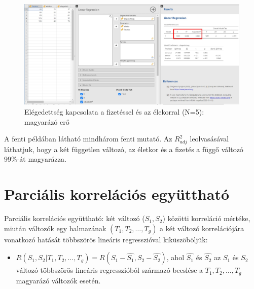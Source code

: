 \documentclass[
  letterpaper,
]{krantz}
\makeatletter
\newenvironment{Shaded}{\begin{snugshade}}{\end{snugshade}}
\newcommand{\CommentTok}[1]{\textcolor[rgb]{0.37,0.37,0.37}{#1}}
\newcommand{\FunctionTok}[1]{\textcolor[rgb]{0.28,0.35,0.67}{#1}}
\newcommand{\NormalTok}[1]{\textcolor[rgb]{0.00,0.23,0.31}{#1}}
\newcommand{\SpecialCharTok}[1]{\textcolor[rgb]{0.37,0.37,0.37}{#1}}
\providecommand{\tightlist}{%
  \setlength{\itemsep}{0pt}\setlength{\parskip}{0pt}}\usepackage{longtable,booktabs,array}
\newenvironment{kframe}{%
\medskip{}
\setlength{\fboxsep}{.8em}
 \def\at@end@of@kframe{}%
 \ifinner\ifhmode%
  \def\at@end@of@kframe{\end{minipage}}%
  \begin{minipage}{\columnwidth}%
 \fi\fi%
 \def\FrameCommand##1{\hskip\@totalleftmargin \hskip-\fboxsep
 \colorbox{shadecolor}{##1}\hskip-\fboxsep
     \hskip-\linewidth \hskip-\@totalleftmargin \hskip\columnwidth}%
 \MakeFramed {\advance\hsize-\width
   \@totalleftmargin\z@ \linewidth\hsize
   \@setminipage}}%
 {\par\unskip\endMakeFramed%
 \at@end@of@kframe}
\renewenvironment{Shaded}{\begin{kframe}}{\end{kframe}}
\makeatother
\begin{document}
\begin{Shaded}
\end{Shaded}

\begin{figure}

{\centering \includegraphics{./images/lin_reg_fizetes_eletkor_elegedettseg_01_kep_04.jpg}

}

\caption{Elégedettség kapcsolata a fizetéssel és az élekorral (N=5):
magyarázó erő}

\end{figure}

A fenti példában látható mindhárom fenti mutató. Az \(R_{adj}^2\)
leolvasásával láthatjuk, hogy a két független változó, az életkor és a
fizetés a függő változó 99\%-át magyarázza.

\hypertarget{parciuxe1lis-korreluxe1ciuxf3s-egyuxfctthatuxf3}{%
\section{Parciális korrelációs
együttható}\label{parciuxe1lis-korreluxe1ciuxf3s-egyuxfctthatuxf3}}

Parciális korrelációs együttható: két változó (\(S_1,S_2\)) közötti
korreláció mértéke, miután változók egy halmazának
\((T_1,T_2,\dots,T_g)\) a két változó korrelációjára vonatkozó hatását
többszörös lineáris regresszióval kiküszöböljük:

\begin{itemize}
\tightlist
\item
  \(R( S_1,S_2 |T_1,T_2,\dots,T_g )= R(S_1- \hat{S_1},S_2- \hat{S_2})\),
  ahol \(\hat{S_1}\) és \(\hat{S_2}\) az \(S_1\) és \(S_2\) változó
  többszörös lineáris regresszióból származó becslése a
  \(T_1,T_2,\dots,T_g\) magyarázó változók esetén.
\end{itemize}
\end{document}
